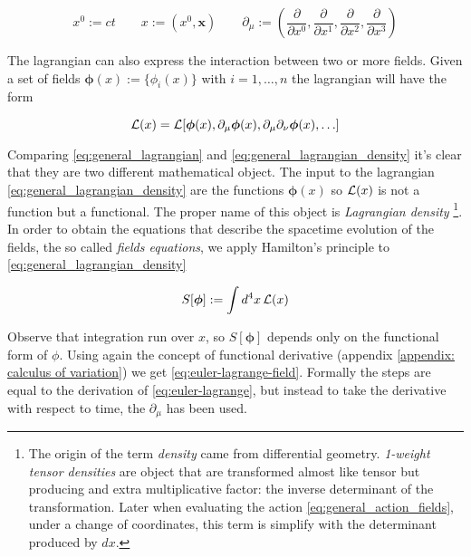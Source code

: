\begin{equation*}
  x^0 := ct \qquad
  x := (x^0, \bm{x}) \qquad
  \partial_{\mu} := \left(
    \frac{\partial}{\partial x^0},
    \frac{\partial}{\partial x^1},
    \frac{\partial}{\partial x^2},
    \frac{\partial}{\partial x^3}
  \right)
\end{equation*}

The lagrangian can also express the interaction between two or more fields.
Given a set of fields $\bm{\phi}(x):=\{\phi_i(x)\}$ with $i=1,\ldots,n$ the
lagrangian will have the form

\begin{equation} \label{eq:general_lagrangian_density}
  \operatorname{\mathcal{L}}(x) = \operatorname{\mathcal{L}}[
      \bm{\phi}(x),
      \partial_{\mu} \bm{\phi}(x),
      \partial_{\mu} \partial_{\nu} \bm{\phi}(x),
      \ldots
    ]
\end{equation}

Comparing \eqref{eq:general_lagrangian} and
\eqref{eq:general_lagrangian_density} it's clear that they are two different
mathematical object. The input to the lagrangian
\eqref{eq:general_lagrangian_density} are the functions $\bm{\phi}(x)$ so
$\operatorname{\mathcal{L}}(x)$ is not a function but a functional. The proper name of this object
is \emph{Lagrangian density}
\footnote{The origin of the term \emph{density} came from differential geometry.
  \emph{1-weight tensor densities} are object that are transformed almost like
  tensor but producing and extra multiplicative factor: the inverse determinant
  of the transformation. Later when evaluating the action
  \eqref{eq:general_action_fields}, under a change of coordinates, this term is
  simplify with the determinant produced by $dx$.
}.
In order to obtain the equations that describe the spacetime evolution of the
fields, the so called \emph{fields equations}, we apply Hamilton's principle to
\eqref{eq:general_lagrangian_density}

\begin{equation} \label{eq:general_action_fields}
  S[\bm{\phi}] := \int d^4x \operatorname{\mathcal{L}}(x)
\end{equation}

Observe that integration run over $x$, so $S[\bm{\phi}]$ depends only on the
functional form of $\phi$. Using again the concept of functional derivative
(appendix \ref{appendix: calculus of variation}) we get
\eqref{eq:euler-lagrange-field}. Formally the steps are equal to the derivation
of \eqref{eq:euler-lagrange}, but instead to take the derivative with respect to
time, the $\partial_{\mu}$ has been used.


